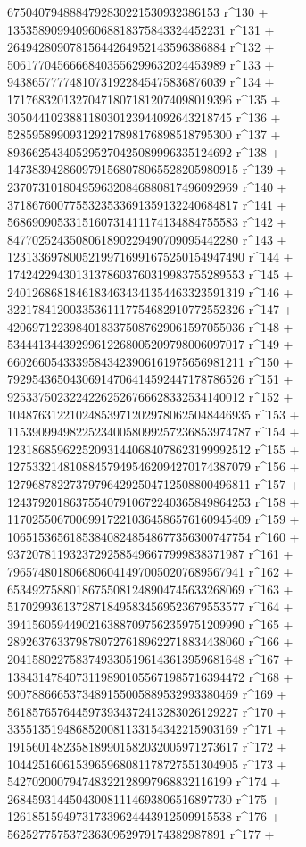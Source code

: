        6750407948884792830221530932386153 r^130 + 
       13535890994096068818375843324452231 r^131 + 
       26494280907815644264952143596386884 r^132 + 
       50617704566668403556299632024453989 r^133 + 
       94386577774810731922845475836876039 r^134 + 
       171768320132704718071812074098019396 r^135 + 
       305044102388118030123944092643218745 r^136 + 
       528595899093129217898176898518795300 r^137 + 
       893662543405295270425089996335124692 r^138 + 
       1473839428609791568078065528205980915 r^139 + 
       2370731018049596320846880817496092969 r^140 + 
       3718676007755323533691359132240684817 r^141 + 
       5686909053315160731411174134884755583 r^142 + 
       8477025243508061890229490709095442280 r^143 + 
       12313369780052199716991675250154947490 r^144 + 
       17424229430131378603760319983755289553 r^145 + 
       24012686818461834634341354463323591319 r^146 + 
       32217841200335361117754682910772552326 r^147 + 
       42069712239840183375087629061597055036 r^148 + 
       53444134439299612268005209798006097017 r^149 + 
       66026605433395843423906161975656981211 r^150 + 
       79295436504306914706414592447178786526 r^151 + 
       92533750232242262526766628332534140012 r^152 + 
       104876312210248539712029780625048446935 r^153 + 
       115390994982252340058099257236853974787 r^154 + 
       123186859622520931440684078623199992512 r^155 + 
       127533214810884579495462094270174387079 r^156 + 
       127968782273797964292504712508800496811 r^157 + 
       124379201863755407910672240365849864253 r^158 + 
       117025506700699172210364586576160945409 r^159 + 
       106515365618538408248548677356300747754 r^160 + 
       93720781193237292585496677999838371987 r^161 + 
       79657480180668060414970050207689567941 r^162 + 
       65349275880186755081248904745633268069 r^163 + 
       51702993613728718495834569523679553577 r^164 + 
       39415605944902163887097562359751209990 r^165 + 
       28926376337987807276189622718834438060 r^166 + 
       20415802275837493305196143613959681648 r^167 + 
       13843147840731198901055671985716394472 r^168 + 
       9007886665373489155005889532993380469 r^169 + 
       5618576576445973934372413283026129227 r^170 + 
       3355135194868520081133154342215903169 r^171 + 
       1915601482358189901582032005971273617 r^172 + 
       1044251606153965968081178727551304905 r^173 + 
       542702000794748322128997968832116199 r^174 + 
       268459314450430081114693806516897730 r^175 + 
       126185159497317339624443912509915538 r^176 + 
       56252775753723630952979174382987891 r^177 + 
